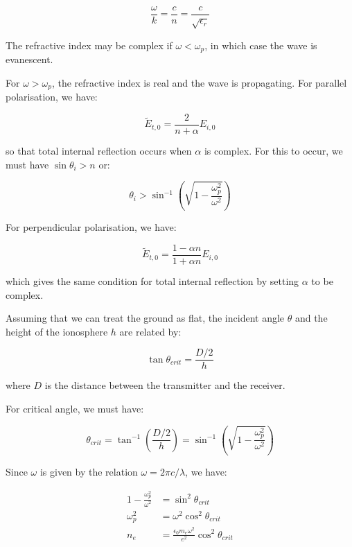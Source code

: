\documentclass[12pt]{article}
\begin{document}
\begin{equation}
    \frac{\omega}{k} = \frac{c}{n} = \frac{c}{\sqrt{\epsilon_{r}}}
\end{equation}

The refractive index may be complex if $\omega < \omega_{p}$, in which case the wave is evanescent.

For $\omega > \omega_{p}$, the refractive index is real and the wave is propagating. For parallel polarisation, we have:

\begin{equation}
    \tilde{E}_{t, 0} = \frac{2}{n + \alpha} E_{i, 0}
\end{equation}

so that total internal reflection occurs when $\alpha$ is complex. For this to occur, we must have $\sin{\theta}_{i} > n$ or:

\begin{equation}
    \theta_{i} > \sin^{-1}{\left( \sqrt{1 - \frac{\omega_{p}^{2}}{\omega^{2}}} \right)}
\end{equation}

For perpendicular polarisation, we have:

\begin{equation}
    \tilde{E}_{t, 0} = \frac{1 - \alpha n}{1 + \alpha n} E_{i, 0}
\end{equation}

which gives the same condition for total internal reflection by setting $\alpha$ to be complex.

Assuming that we can treat the ground as flat, the incident angle $\theta$ and the height of the ionosphere $h$ are related by:

\begin{equation}
    \tan{\theta_{crit}} = \frac{D/2}{h}
\end{equation}

where $D$ is the distance between the transmitter and the receiver.

For critical angle, we must have:

\begin{equation}
    \theta_{crit} = \tan^{-1}{\left( \frac{D/2}{h} \right)} = \sin^{-1}{\left( \sqrt{1 - \frac{\omega_{p}^{2}}{\omega^{2}}} \right)}
\end{equation}

Since $\omega$ is given by the relation $\omega = 2\pi c/\lambda$, we have:

\begin{equation}
\begin{split}
    1 - \frac{\omega_{p}^{2}}{\omega^{2}} &= \sin^{2}{\theta_{crit}} \\
    \omega_{p}^{2} &= \omega^{2} \cos^{2}{\theta_{crit}} \\
    n_{e} &= \frac{\epsilon_{0} m_{e} \omega^{2}}{e^{2}} \cos^{2}{\theta_{crit}}
\end{split}
\end{equation}
\end{document}

